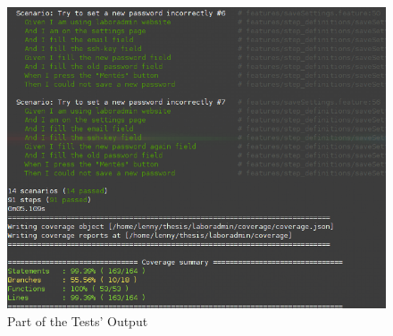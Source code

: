 \begin{figure}[!ht]
	\includegraphics[width=\textwidth]{figures/test-result.png}
	\caption{Part of the Tests' Output}
	\label{fig:test-results}
	\end{figure}

